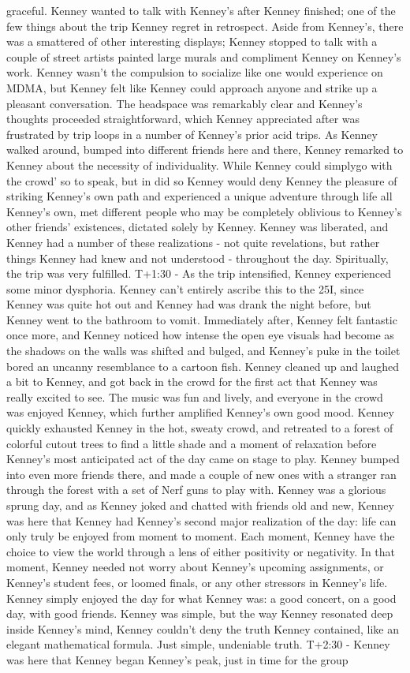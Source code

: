 \documentclass[12pt]{book}
\begin{document}
graceful. Kenney wanted to talk with Kenney's after Kenney finished; one of the few things about the trip Kenney regret in retrospect. Aside from Kenney's, there was a smattered of other interesting displays; Kenney stopped to talk with a couple of street artists painted large murals and compliment Kenney on Kenney's work. Kenney wasn't the compulsion to socialize like one would experience on MDMA, but Kenney felt like Kenney could approach anyone and strike up a pleasant conversation. The headspace was remarkably clear and Kenney's thoughts proceeded straightforward, which Kenney appreciated after was frustrated by trip loops in a number of Kenney's prior acid trips. As Kenney walked around, bumped into different friends here and there, Kenney remarked to Kenney about the necessity of individuality. While Kenney could simplygo with the crowd' so to speak, but in did so Kenney would deny Kenney the pleasure of striking Kenney's own path and experienced a unique adventure through life all Kenney's own, met different people who may be completely oblivious to Kenney's other friends' existences, dictated solely by Kenney. Kenney was liberated, and Kenney had a number of these realizations - not quite revelations, but rather things Kenney had knew and not understood - throughout the day. Spiritually, the trip was very fulfilled. T+1:30 - As the trip intensified, Kenney experienced some minor dysphoria. Kenney can't entirely ascribe this to the 25I, since Kenney was quite hot out and Kenney had was drank the night before, but Kenney went to the bathroom to vomit. Immediately after, Kenney felt fantastic once more, and Kenney noticed how intense the open eye visuals had become as the shadows on the walls was shifted and bulged, and Kenney's puke in the toilet bored an uncanny resemblance to a cartoon fish. Kenney cleaned up and laughed a bit to Kenney, and got back in the crowd for the first act that Kenney was really excited to see. The music was fun and lively, and everyone in the crowd was enjoyed Kenney, which further amplified Kenney's own good mood. Kenney quickly exhausted Kenney in the hot, sweaty crowd, and retreated to a forest of colorful cutout trees to find a little shade and a moment of relaxation before Kenney's most anticipated act of the day came on stage to play. Kenney bumped into even more friends there, and made a couple of new ones with a stranger ran through the forest with a set of Nerf guns to play with. Kenney was a glorious sprung day, and as Kenney joked and chatted with friends old and new, Kenney was here that Kenney had Kenney's second major realization of the day: life can only truly be enjoyed from moment to moment. Each moment, Kenney have the choice to view the world through a lens of either positivity or negativity. In that moment, Kenney needed not worry about Kenney's upcoming assignments, or Kenney's student fees, or loomed finals, or any other stressors in Kenney's life. Kenney simply enjoyed the day for what Kenney was: a good concert, on a good day, with good friends. Kenney was simple, but the way Kenney resonated deep inside Kenney's mind, Kenney couldn't deny the truth Kenney contained, like an elegant mathematical formula. Just simple, undeniable truth. T+2:30 - Kenney was here that Kenney began Kenney's peak, just in time for the group 
\end{document}
